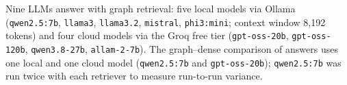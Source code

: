 Nine LLMs answer with graph retrieval: five local models via Ollama
(\texttt{qwen2.5:7b}, \texttt{llama3}, \texttt{llama3.2}, \texttt{mistral},
\texttt{phi3:mini}; context window 8,192 tokens) and four cloud models via the
Groq free tier (\texttt{gpt-oss-20b}, \texttt{gpt-oss-120b}, \texttt{qwen3.8-27b},
\texttt{allam-2-7b}). The graph--dense comparison of answers uses one local and
one cloud model (\texttt{qwen2.5:7b} and \texttt{gpt-oss-20b}); \texttt{qwen2.5:7b}
was run twice with each retriever to measure run-to-run variance.
